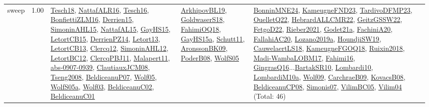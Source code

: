 {\begin{longtable}{p{3cm}r>{\raggedright\arraybackslash}p{6cm}>{\raggedright\arraybackslash}p{6cm}>{\raggedright\arraybackslash}p{8cm}}
\index{sweep}\index{Algorithms!sweep}sweep &  1.00 & \hyperref[detail:Tesch18]{Tesch18}, \hyperref[detail:NattafALR16]{NattafALR16}, \hyperref[detail:Tesch16]{Tesch16}, \hyperref[detail:BonfiettiZLM16]{BonfiettiZLM16}, \hyperref[detail:Derrien15]{Derrien15}, \hyperref[detail:SimoninAHL15]{SimoninAHL15}, \hyperref[detail:NattafAL15]{NattafAL15}, \hyperref[detail:GayHS15]{GayHS15}, \hyperref[detail:LetortCB15]{LetortCB15}, \hyperref[detail:DerrienPZ14]{DerrienPZ14}, \hyperref[detail:Letort13]{Letort13}, \hyperref[detail:LetortCB13]{LetortCB13}, \hyperref[detail:Clercq12]{Clercq12}, \hyperref[detail:SimoninAHL12]{SimoninAHL12}, \hyperref[detail:LetortBC12]{LetortBC12}, \hyperref[detail:ClercqPBJ11]{ClercqPBJ11}, \hyperref[detail:Malapert11]{Malapert11}, \hyperref[detail:abs-0907-0939]{abs-0907-0939}, \hyperref[detail:ClautiauxJCM08]{ClautiauxJCM08}, \hyperref[detail:Tseng2008]{Tseng2008}, \hyperref[detail:BeldiceanuP07]{BeldiceanuP07}, \hyperref[detail:Wolf05]{Wolf05}, \hyperref[detail:WolfS05a]{WolfS05a}, \hyperref[detail:Wolf03]{Wolf03}, \hyperref[detail:BeldiceanuC02]{BeldiceanuC02}, \hyperref[detail:BeldiceanuC01]{BeldiceanuC01} & \hyperref[detail:ArkhipovBL19]{ArkhipovBL19}, \hyperref[detail:GoldwaserS18]{GoldwaserS18}, \hyperref[detail:FahimiOQ18]{FahimiOQ18}, \hyperref[detail:GayHS15a]{GayHS15a}, \hyperref[detail:Schutt11]{Schutt11}, \hyperref[detail:AronssonBK09]{AronssonBK09}, \hyperref[detail:PoderB08]{PoderB08}, \hyperref[detail:WolfS05]{WolfS05} & \hyperref[detail:BonninMNE24]{BonninMNE24}, \hyperref[detail:KameugneFND23]{KameugneFND23}, \hyperref[detail:TardivoDFMP23]{TardivoDFMP23}, \hyperref[detail:OuelletQ22]{OuelletQ22}, \hyperref[detail:HebrardALLCMR22]{HebrardALLCMR22}, \hyperref[detail:GeitzGSSW22]{GeitzGSSW22}, \hyperref[detail:FetgoD22]{FetgoD22}, \hyperref[detail:Rieber2021]{Rieber2021}, \hyperref[detail:Godet21a]{Godet21a}, \hyperref[detail:FachiniA20]{FachiniA20}, \hyperref[detail:FallahiAC20]{FallahiAC20}, \hyperref[detail:Lozano2019a]{Lozano2019a}, \hyperref[detail:HoundjiSW19]{HoundjiSW19}, \hyperref[detail:CauwelaertLS18]{CauwelaertLS18}, \hyperref[detail:KameugneFGOQ18]{KameugneFGOQ18}, \hyperref[detail:Ruixin2018]{Ruixin2018}, \hyperref[detail:Madi-WambaLOBM17]{Madi-WambaLOBM17}, \hyperref[detail:Fahimi16]{Fahimi16}, \hyperref[detail:GingrasQ16]{GingrasQ16}...\hyperref[detail:BartakSR10]{BartakSR10}, \hyperref[detail:Lombardi10]{Lombardi10}, \hyperref[detail:LombardiM10a]{LombardiM10a}, \hyperref[detail:Wolf09]{Wolf09}, \hyperref[detail:CarchraeB09]{CarchraeB09}, \hyperref[detail:KovacsB08]{KovacsB08}, \hyperref[detail:BeldiceanuCP08]{BeldiceanuCP08}, \hyperref[detail:Simonis07]{Simonis07}, \hyperref[detail:VilimBC05]{VilimBC05}, \hyperref[detail:Vilim04]{Vilim04} (Total: 46)\\

\end{longtable}}

